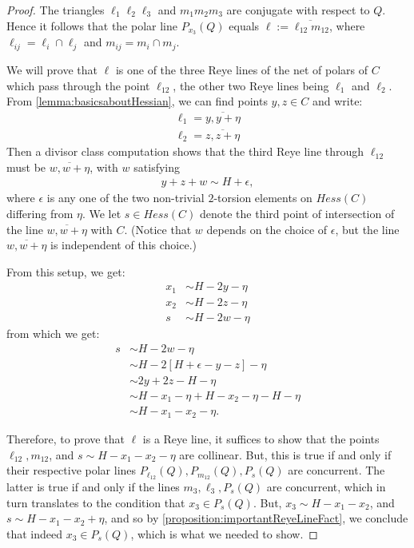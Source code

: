 \documentclass[11pt,reqno]{amsart}
\theoremstyle{plain}
\theoremstyle{definition}
\theoremstyle{remark}
\numberwithin{equation}{section}
\numberwithin{equation}{section}
\begin{document}
\begin{proof}
    The triangles $\ell_{1}\ell_{2}\ell_{3}$ and $m_{1}m_{2}m_{3}$ are conjugate with respect to $Q$.  Hence it follows that the polar line $P_{x_{3}}(Q)$ equals $\ell := \overline{\ell_{12}m_{12}}$, where $\ell_{ij} = \ell_{i} \cap \ell_{j}$ and $m_{ij} = m_{i} \cap m_{j}$.
    
    We will prove that $\ell$ is one of the three Reye lines of the net of polars of $C$ which pass through the point $\ell_{12}$, the other two Reye lines being $\ell_{1}$ and $\ell_{2}$. From \autoref{lemma:basicsaboutHessian}, we can find points $y,z \in C$ and write: 
    \begin{align*}
        \ell_{1} = \overline{y, y + \eta}\\
        \ell_{2} = \overline{z, z + \eta}
    \end{align*}
Then a divisor class computation shows that the third Reye line through $\ell_{12}$ must be $\overline{w,w + \eta}$, with $w$ satisfying 
\begin{align*}
    y+z+w \sim H + \epsilon,
\end{align*}
where $\epsilon$ is any one of the two non-trivial $2$-torsion elements on $Hess(C)$ differing from $\eta$.  We let $s \in Hess(C)$ denote the third point of intersection of the line $\overline{w,w + \eta}$ with $C$. (Notice that $w$ depends on the choice of $\epsilon$, but the line $\overline{w,w + \eta}$ is independent of this choice.)

From this setup, we get: 
\begin{align*}
    x_{1} &\sim H-2y-\eta\\
    x_{2} &\sim H-2z - \eta\\
    s &\sim H-2w - \eta
\end{align*}
from which we get:
\begin{align*}
    s &\sim H-2w - \eta\\
    &\sim H - 2[H+\epsilon -y-z] - \eta\\
    &\sim 2y+2z-H-\eta\\
    &\sim H-x_{1}-\eta + H-x_{2}-\eta-H-\eta\\
    &\sim H-x_{1}-x_{2} - \eta.
\end{align*}

Therefore, to prove that $\ell$ is a Reye line, it suffices to show that the points $\ell_{12}, m_{12}$, and $s \sim H-x_{1}-x_{2}-\eta$ are collinear.  But, this is true if and only if their respective polar lines $P_{\ell_{12}}(Q), P_{m_{12}}(Q), P_{s}(Q)$ are concurrent.  The latter is true if and only if the lines $m_{3}, \ell_{3}, P_{s}(Q)$ are concurrent, which in turn  translates to the condition that $x_{3} \in P_{s}(Q)$.  But, $x_{3} \sim H-x_{1}-x_{2}$, and $s \sim H-x_{1}-x_{2}+\eta$, and so by \autoref{proposition:importantReyeLineFact}, we conclude that indeed $x_{3} \in P_{s}(Q)$, which is what we needed to show.
\end{proof}
\end{document}
